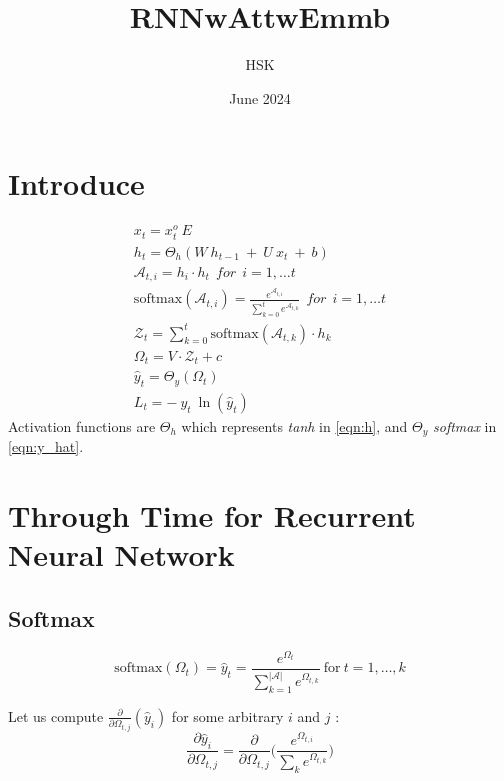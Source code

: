 \documentclass{article}
\title{RNNwAttwEmmb}
\author{HSK}
\date{June 2024}
\begin{document}
\maketitle
\section{Introduce}

\begin{eqnarray}
\label{eqn:x}
	x_t = x^o_t ~ E\\
\label{eqn:h}
        h_t = \Theta_h(W ~h_{t-1}~+~U~x_t ~+~b)\\
	\mathcal{A}_{t,i} = h_i  \cdot h_t~~for~~ i =1, \ldots t\\
\text{softmax}(\mathcal{A}_{t,i}) = \frac{e^{\mathcal{A}_{t,i }}}{\sum_{k=0}^{t} e^{\mathcal{A}_{t,k}}} ~~for~~ i =1, \ldots t \\
\mathcal{Z}_t = \sum_{k=0}^{t}  \text{softmax}(\mathcal{A}_{t,k}) \cdot h_k \\
\label{eqn:omega}
\Omega_t = V \cdot \mathcal{Z}_t + c\\
\label{eqn:y_hat}
\hat{y}_t = \Theta_y(\Omega_t)\\
\label{eqn:Loss}
        L_t = -~y_t~\ln{(\hat{y}_t)}
\end{eqnarray}
Activation functions are $\Theta_h$ which represents \textit{tanh} in \eqref{eqn:h}, and $\Theta_y$ \textit{softmax} in \eqref{eqn:y_hat}.

\section{Through Time for Recurrent Neural Network}
\subsection{Softmax}
\begin{equation}\nonumber
\text{softmax} (\Omega_{t})=\hat{y}_{t}=\frac{e^{\Omega_t}}{\sum_{k=1}^{|\mathcal{A}|} e^{\Omega_{t,k}}} ~\text{for}~ t=1, \ldots, k
\end{equation}

%
Let us compute $\frac{\partial }{\partial \Omega_{t,j}} (\hat{y}_{i})$ for some arbitrary $i$ and $j$ :
$$
\frac{\partial \hat{y}_{i}}{\partial \Omega_{t,j}}=\frac{\partial}{\partial \Omega_{t,j}}\bigg( \frac{e^{\Omega_{t,i}}}{\sum_{k} e^{\Omega_{t,k}}}\bigg)
$$
\end{document}
